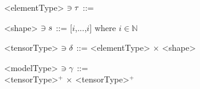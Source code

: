 \begin{minipage}[t]{\textwidth}
\setlength{\grammarindent}{8.5em}
\begin{grammar}	
	<elementType> $\ni \tau$ ::= \missing

	<shape> $\ni s$ ::= [$i$,...,$i$] \hspace{0.5em} where $i \in \mathbb{N}$ 

	<tensorType> $\ni \delta$ ::= <elementType>  $\times$ <shape>
	
	<modelType> $\ni \gamma$ ::= \\ <tensorType>$^+$ $\times$ <tensorType>$^+$
\end{grammar}
\end{minipage}
